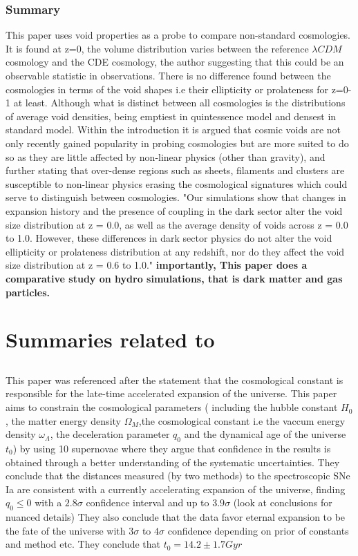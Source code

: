 \documentclass[fleqn,usenatbib]{mnras}
\begin{document}
\subsubsection{Summary}
This paper uses void properties as a probe to compare non-standard cosmologies. It is found at z=0, the volume distribution varies between the reference $\lambda CDM$ cosmology and the CDE cosmology, the author suggesting that this could be an observable statistic in observations. There is no difference found between the cosmologies in terms of the void shapes i.e their ellipticity or prolateness for z=0-1 at least. Although what is distinct between all cosmologies is the distributions of average void densities, being emptiest in quintessence model and densest in standard model.
Within the introduction it is argued that cosmic voids are not only recently gained popularity in probing cosmologies but are more suited to do so as they are little affected by non-linear physics (other than gravity), and further stating that over-dense regions such as sheets, filaments and clusters are susceptible to non-linear physics erasing the cosmological signatures which could serve to distinguish between cosmologies. "Our simulations show that changes in expansion history and the presence of coupling in the dark sector alter the void size distribution at z = 0.0, as well as the average density of voids across z = 0.0 to 1.0. However, these differences in dark sector physics do not alter the void ellipticity or prolateness distribution at any redshift, nor do they affect the void size distribution at z = 0.6 to 1.0." \citep{Adermann_17} \textbf{importantly, This paper does a comparative study on hydro simulations, that is dark matter and gas particles.}

\section{Summaries related to \citet{Adermann_17}}

\subsection{\citet{Riess_98}}
This paper was referenced after the statement that the cosmological constant is responsible for the late-time accelerated expansion of the universe.
This paper aims to constrain the cosmological parameters ( including the hubble constant $H_{0}$, the matter energy density $\Omega_{M}$,the cosmological constant i.e the vaccum energy density $\omega_{\Lambda}$, the deceleration parameter $q_{0}$ and the dynamical age of the universe $t_{0}$) by using 10 supernovae where they argue that confidence in the results is obtained through a better understanding of the systematic uncertainties.
They conclude that the distances measured (by two methods) to the spectroscopic SNe Ia are consistent with a currently accelerating  expansion of the universe, finding $q_{0}\leq 0$ with a $2.8\sigma$ confidence interval and up to $3.9\sigma$ (look at conclusions for nuanced details)
They also conclude that the data favor eternal expansion to be the fate of the universe with $3\sigma$ to $4\sigma$ confidence depending on prior of constants and method etc.
They conclude that $t_{0}=14.2\pm 1.7 Gyr$
\end{document}
